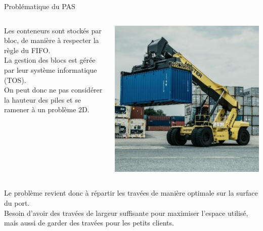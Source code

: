 \begin{frame}{Problématique du PAS}
  \begin{columns}
    \begin{column}{0.7\textwidth}
      Les conteneurs sont stockés par bloc, de manière à respecter la règle du FIFO.\\
      La gestion des blocs est gérée par leur système informatique (TOS).\\
      On peut donc ne pas considérer la hauteur des piles et se ramener à un problème 2D.
    \end{column}
    \begin{column}{0.3\textwidth}
      \includegraphics[width=\textwidth]{../images/PAS_stacker}
    \end{column}
  \end{columns}
  \vfill
  Le problème revient donc à répartir les travées de manière optimale sur la surface du port.\\
  Besoin d'avoir des travées de largeur suffisante pour maximiser l'espace utilisé, mais aussi de garder des travées pour les petits clients.
\end{frame}
